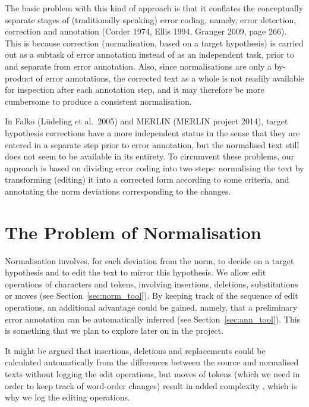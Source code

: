 \documentclass[10pt, a4paper]{article}
\begin{document}
The basic problem with this kind of approach is that it conflates the conceptually separate stages of (traditionally speaking) error coding, namely, error detection, correction and annotation (Corder 1974, Ellis 1994, Granger 2009, page 266). This is because correction (normalisation, based on a target hypothesis) is carried out as a subtask of error annotation instead of as an independent task, prior to and separate from error annotation. Also, since normalisations are only a by-product of error annotations, the corrected text as a whole is not readily available for inspection after each annotation step, and it may therefore be more cumbersome to produce a consistent normalisation.

In Falko (L{\"u}deling et al.\ 2005) and MERLIN (MERLIN project 2014), target hypothesis corrections have a more independent status in the sense that they are entered in a separate step prior to error annotation, but the normalised text still does not seem to be available in its entirety. To circumvent these problems, our approach is based on dividing error coding into two steps: normalising the text by transforming (editing) it into a corrected form according to some criteria, and annotating the norm deviations corresponding to the changes.

\section{The Problem of Normalisation}

Normalisation involves, for each deviation from the norm, to decide on a target hypothesis and to edit the text to mirror this hypothesis. We allow edit operations of characters and tokens, involving insertions, deletions, substitutions %
or moves (see Section~\ref{sec:norm_tool}). By keeping track of the sequence of edit operations, an additional advantage could be gained, namely, that a preliminary error annotation can be automatically inferred (see Section~\ref{sec:ann_tool}). This is something that we plan to explore later on in the project.

It might be argued that insertions, deletions and
replacements could be calculated automatically from the differences between the source and normalised texts without logging the edit operations, but moves of tokens (which we need in order to keep track of word-order changes) result in added complexity \cite{ShapiraStorer2007}, which is why we log the editing operations.
\end{document}
